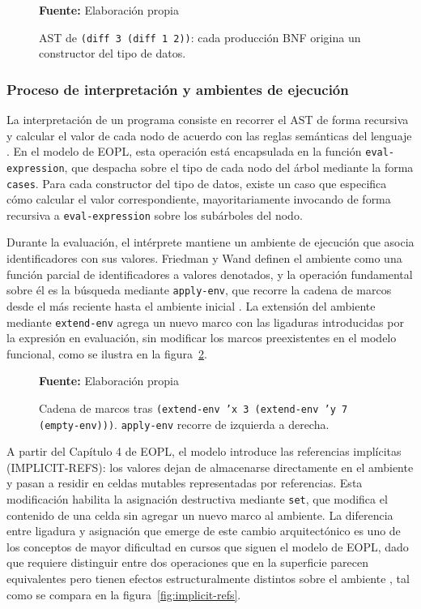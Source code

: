 \begin{figure}[htbp]
\centering

\caption{AST de \texttt{(diff 3 (diff 1 2))}: cada producción BNF origina un constructor del tipo de datos.}
\scriptsize \textbf{Fuente:} Elaboración propia
\label{fig:ast-diff}
\end{figure}

\subsubsection{Proceso de interpretación y ambientes de ejecución}

La interpretación de un programa consiste en recorrer el AST de forma recursiva y calcular el valor de cada nodo de acuerdo con las reglas semánticas del lenguaje \cite{Friedman2008EPL}. En el modelo de EOPL, esta operación está encapsulada en la función \texttt{eval-expression}, que despacha sobre el tipo de cada nodo del árbol mediante la forma \texttt{cases}. Para cada constructor del tipo de datos, existe un caso que especifica cómo calcular el valor correspondiente, mayoritariamente invocando de forma recursiva a \texttt{eval-expression} sobre los subárboles del nodo.

Durante la evaluación, el intérprete mantiene un ambiente de ejecución que asocia identificadores con sus valores. Friedman y Wand definen el ambiente como una función parcial de identificadores a valores denotados, y la operación fundamental sobre él es la búsqueda mediante \texttt{apply-env}, que recorre la cadena de marcos desde el más reciente hasta el ambiente inicial \cite{Friedman2008EPL}. La extensión del ambiente mediante \texttt{extend-env} agrega un nuevo marco con las ligaduras introducidas por la expresión en evaluación, sin modificar los marcos preexistentes en el modelo funcional, como se ilustra en la figura~\ref{fig:cadena-marcos}.

\begin{figure}[htbp]
\centering

\caption[Cadena de marcos tras sucesivas extensiones del ambiente]{Cadena de marcos tras \texttt{(extend-env 'x 3 (extend-env 'y 7 (empty-env)))}. \texttt{apply-env} recorre de izquierda a derecha.}
\scriptsize \textbf{Fuente:} Elaboración propia
\label{fig:cadena-marcos}
\end{figure}

A partir del Capítulo 4 de EOPL, el modelo introduce las referencias implícitas (IMPLICIT-REFS): los valores dejan de almacenarse directamente en el ambiente y pasan a residir en celdas mutables representadas por referencias. Esta modificación habilita la asignación destructiva mediante \texttt{set}, que modifica el contenido de una celda sin agregar un nuevo marco al ambiente. La diferencia entre ligadura y asignación que emerge de este cambio arquitectónico es uno de los conceptos de mayor dificultad en cursos que siguen el modelo de EOPL, dado que requiere distinguir entre dos operaciones que en la superficie parecen equivalentes pero tienen efectos estructuralmente distintos sobre el ambiente \cite{zagami2023}, tal como se compara en la figura~\ref{fig:implicit-refs}.

